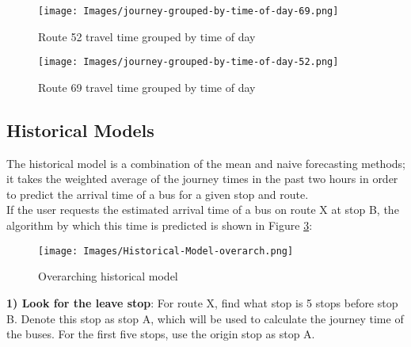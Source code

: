 \begin{figure}[H]
\begin{center}
    \texttt{[image: Images/journey-grouped-by-time-of-day-69.png]}
    \caption{Route 52 travel time grouped by time of day}
    \label{fig:time-of-day-52-2}
\end{center}
\end{figure}

\begin{figure}[H]
\begin{center}
    \texttt{[image: Images/journey-grouped-by-time-of-day-52.png]}
    \caption{Route 69 travel time grouped by time of day}
    \label{fig:time-of-day-69}
\end{center}
\end{figure}

\subsection{Historical Models}
\label{section:historical-model-design}

The historical model is a combination of the mean and naive forecasting methods; it takes the weighted average of the journey times in the past two hours in order to predict the arrival time of a bus for a given stop and route. \\

If the user requests the estimated arrival time of a bus on route X at stop B, the algorithm by which this time is predicted is shown in Figure \ref{fig:historical-flow}: 

\begin{figure}[H]
\begin{center}
    \texttt{[image: Images/Historical-Model-overarch.png]}
    \caption{Overarching historical model}
    \label{fig:historical-flow}
\end{center}
\end{figure}

\textbf{1) Look for the leave stop}: For route X, find what stop is 5 stops before stop B. Denote this stop as stop A, which will be used to calculate the journey time of the buses. For the first five stops, use the origin stop as stop A. \\

